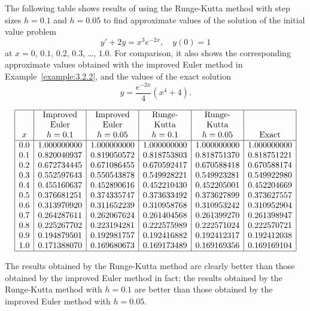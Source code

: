 \documentclass{ximera}
\begin{document}
\begin{example}\label{example:3.3.2}
The following table shows results of using the Runge-Kutta method
with step sizes $h=0.1$ and $h=0.05$ to find approximate values of
the solution of the initial value problem
$$
y'+2y=x^3e^{-2x},\quad y(0)=1
$$
at $x=0$, $0.1$, $0.2$, $0.3$, \dots, $1.0$. For comparison, it also shows
the
corresponding approximate values obtained with the improved Euler
method in Example~\ref{example:3.2.2}, and the values of the exact
solution
$$
y=\frac{e^{-2x}}{4}(x^4+4).
$$

$$
\begin{array}{|c|c|c|c|c|c|}
\hline
 & \text{Improved} & \text{Improved} & \text{Runge-} & \text{Runge-}& \\
 & \text{Euler} &\text{Euler} &\text{Kutta} & \text{Kutta}& \\
x&
h=0.1&
h=0.05&
h=0.1&
h=0.05&
\text{Exact}\\ \hline
0.0 & 1.000000000   &1.000000000 &1.000000000 & 1.000000000& 1.000000000 \\
0.1 & 0.820040937   &0.819050572 &0.818753803 & 0.818751370& 0.818751221 \\
0.2 & 0.672734445   &0.671086455 &0.670592417 & 0.670588418& 0.670588174 \\
0.3 & 0.552597643   &0.550543878 &0.549928221 & 0.549923281& 0.549922980 \\
0.4 & 0.455160637   &0.452890616 &0.452210430 & 0.452205001& 0.452204669 \\
0.5 & 0.376681251   &0.374335747 &0.373633492 & 0.373627899& 0.373627557 \\
0.6 & 0.313970920   &0.311652239 &0.310958768 & 0.310953242& 0.310952904 \\
0.7 & 0.264287611   &0.262067624 &0.261404568 & 0.261399270& 0.261398947 \\
0.8 & 0.225267702   &0.223194281 &0.222575989 & 0.222571024& 0.222570721 \\
0.9 & 0.194879501   &0.192981757 &0.192416882 & 0.192412317& 0.192412038 \\
1.0 & 0.171388070   &0.169680673 &0.169173489 & 0.169169356& 0.169169104\\
\hline
\end{array}
$$


The results obtained by the Runge-Kutta method are clearly better
than those obtained by the improved Euler method   in fact; the results
obtained by the Runge-Kutta method with $h=0.1$ are better than those
obtained by the improved Euler method with $h=0.05$.
\end{example}
\end{document}
